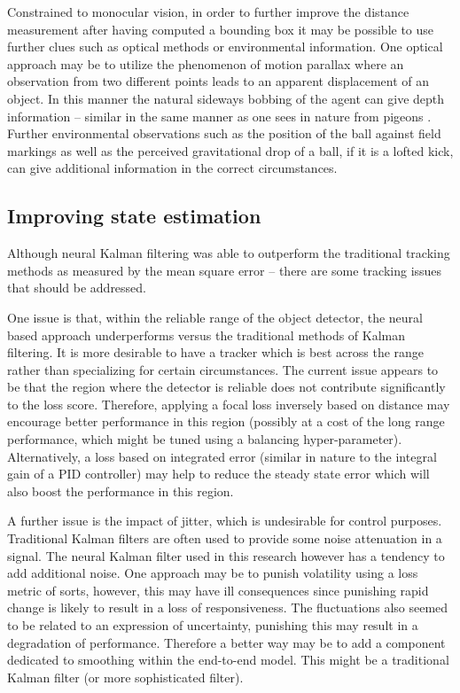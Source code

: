 \documentclass[a4paper,twoside,12pt]{report}
\begin{document}
Constrained to monocular vision, in order to further improve the distance measurement after having computed a bounding box it may be possible to use further clues such as optical methods or environmental information. One optical approach may be to utilize the phenomenon of motion parallax where an observation from two different points leads to an apparent displacement of an object. In this manner the natural sideways bobbing of the agent can give depth information -- similar in the same manner as one sees in nature from pigeons \citep{parrelax}. Further environmental observations such as the position of the ball against field markings as well as the perceived gravitational drop of a ball, if it is a lofted kick, can give additional information in the correct circumstances.

\subsection{Improving state estimation}

Although neural Kalman filtering was able to outperform the traditional tracking methods as measured by the mean square error -- there are some tracking issues that should be addressed. 

One issue is that, within the reliable range of the object detector, the neural based approach underperforms versus the traditional methods of Kalman filtering. It is more desirable to have a tracker which is best across the range rather than specializing for certain circumstances. The current issue appears to be that the region where the detector is reliable does not contribute significantly to the loss score. Therefore, applying a focal loss inversely based on distance may encourage better performance in this region (possibly at a cost of the long range performance, which might be tuned using a balancing hyper-parameter). Alternatively, a loss based on integrated error (similar in nature to the integral gain of a PID controller) may help to reduce the steady state error which will also boost the performance in this region.  

A further issue is the impact of jitter, which is undesirable for control purposes. Traditional Kalman filters are often used to provide some noise attenuation in a signal. The neural Kalman filter used in this research however has a tendency to add additional noise. One approach may be to punish volatility using a loss metric of sorts, however, this may have ill consequences since punishing rapid change is likely to result in a loss of responsiveness. The fluctuations also seemed to be related to an expression of uncertainty, punishing this may result in a degradation of performance. Therefore a better way may be to add a component dedicated to smoothing within the end-to-end model. This might be a traditional Kalman filter (or more sophisticated filter).
\end{document}
